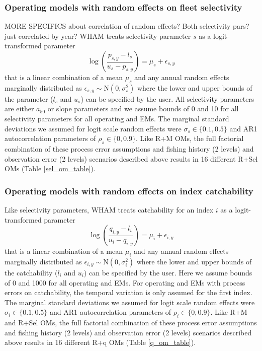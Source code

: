 \documentclass[
  12pt,
]{article}
\begin{document}
\hypertarget{operating-models-with-random-effects-on-fleet-selectivity}{%
\subsubsection*{Operating models with random effects on fleet
selectivity}\label{operating-models-with-random-effects-on-fleet-selectivity}}

MORE SPECIFICS about correlation of random effects? Both selectivity
pars? just correlated by year? WHAM treats selectivity parameter \(s\)
as a logit-transformed parameter \[
\log\left(\frac{p_{s,y}-l_{s}}{u_{s}-p_{s,y}}\right) = \mu_s + \epsilon_{s,y}
\] that is a linear combination of a mean \(\mu_s\) and any annual
random effects marginally distributed as
\(\epsilon_{s,y} \sim \text{N}\left(0,\sigma_s^2\right)\) where the
lower and upper bounds of the parameter (\(l_s\) and \(u_s\)) can be
specified by the user. All selectivity parameters are either \(a_50\) or
slope parameters and we assume bounds of 0 and 10 for all selectivity
parameters for all operating and EMs. The marginal standard deviations
we assumed for logit scale random effects were
\(\sigma_s \in \{0.1, 0.5\}\) and AR1 autocorrelation parameters of
\(\rho_s \in \{0,0.9\}\). Like R+M OMs, the full factorial combination
of these process error assumptions and fishing history (2 levels) and
observation error (2 levels) scenarios described above results in 16
different R+Sel OMs (Table \ref{sel_om_table}).

\hypertarget{operating-models-with-random-effects-on-index-catchability}{%
\subsubsection*{Operating models with random effects on index
catchability}\label{operating-models-with-random-effects-on-index-catchability}}

Like selectivity parameters, WHAM treats catchability for an index \(i\)
as a logit-transformed parameter \[
\log\left(\frac{q_{i,y}-l_{i}}{u_{i}-q_{i,y}}\right) = \mu_i + \epsilon_{i,y}
\] that is a linear combination of a mean \(\mu_i\) and any annual
random effects marginally distributed as
\(\epsilon_{i,y} \sim \text{N}\left(0,\sigma_i^2\right)\) where the
lower and upper bounds of the catchability (\(l_i\) and \(u_i\)) can be
specified by the user. Here we assume bounds of 0 and 1000 for all
operating and EMs. For operating and EMs with process errors on
catchability, the temporal variation is only assumed for the first
index. The marginal standard deviations we assumed for logit scale
random effects were \(\sigma_i \in \{0.1, 0.5\}\) and AR1
autocorrelation parameters of \(\rho_i \in \{0,0.9\}\). Like R+M and
R+Sel OMs, the full factorial combination of these process error
assumptions and fishing history (2 levels) and observation error (2
levels) scenarios described above results in 16 different R+q OMs (Table
\ref{q_om_table}).
\end{document}
